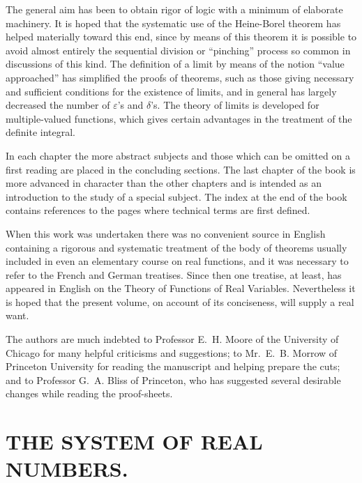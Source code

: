 \documentclass[a4paper,12pt]{book}[2004/02/16]
\providecommand{\hypertarget}[2]{#2}
\theoremstyle{ilemma}
\theoremstyle{itheorem}
\theoremstyle{iother}
\theoremstyle{icorollary}
\theoremstyle{numcorollary}
\theoremstyle{idefinition}
\begin{document}
The general aim has been to obtain rigor of logic with a
minimum of elaborate machinery. It is hoped that the systematic
use of the Heine-Borel theorem has helped materially
toward this end, since by means of this theorem it is possible
to avoid almost entirely the sequential division or ``pinching''
process so common in discussions of this kind. The definition
of a limit by means of the notion ``value approached'' has
simplified the proofs of theorems, such as those giving necessary
and sufficient conditions for the existence of limits, and in
general has largely decreased the number of $\varepsilon$'s and
$\delta$'s. The theory of limits is developed for multiple-valued
functions, which gives certain advantages in the treatment of the
definite integral.

In each chapter the more abstract subjects and those which
can be omitted on a first reading are placed in the concluding
sections. The last chapter of the book is more advanced in
character than the other chapters and is intended as an introduction
to the study of a special subject. The index at the
end of the book contains references to the pages where technical
terms are first defined.

When this work was undertaken there was no convenient
source in English containing a rigorous and systematic treatment
of the body of theorems usually included in even an elementary
course on real functions, and it was necessary to refer
to the French and German treatises. Since then one treatise,
at least, has appeared in English on the Theory of Functions
of Real Variables. Nevertheless it is hoped that the present
volume, on account of its conciseness, will supply a real want.

The authors are much indebted to Professor E.~H. Moore
of the University of Chicago for many helpful criticisms and
suggestions; to Mr.~E.~B. Morrow of Princeton University for
reading the manuscript and helping prepare the cuts; and to
Professor G.~A. Bliss of Princeton, who has suggested several
desirable changes while reading the proof-sheets.
\tableofcontents

\mainmatter
\chapter{THE SYSTEM OF REAL NUMBERS.}\hypertarget{chapI}{}%
\end{document}
